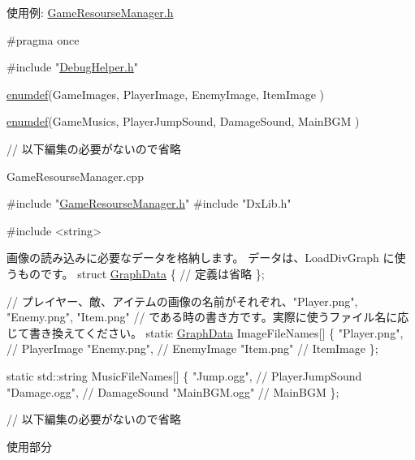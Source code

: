 使用例\+: \hyperlink{_game_resourse_manager_8h}{Game\+Resourse\+Manager.\+h} 
\begin{DoxyCode}
\textcolor{preprocessor}{#pragma once}

\textcolor{preprocessor}{#include "\hyperlink{_debug_helper_8h}{DebugHelper.h}"}

\hyperlink{_game_resourse_manager_8h_ad4ba4fe9f17a7a6b57283d945e6dcde7}{enumdef}(GameImages,
    PlayerImage,
    EnemyImage,
    ItemImage
)

\hyperlink{_game_resourse_manager_8h_ad4ba4fe9f17a7a6b57283d945e6dcde7}{enumdef}(GameMusics,
    PlayerJumpSound,
    DamageSound,
    MainBGM
)

\textcolor{comment}{// 以下編集の必要がないので省略}
\end{DoxyCode}
 Game\+Resourse\+Manager.\+cpp 
\begin{DoxyCode}
\textcolor{preprocessor}{#include "\hyperlink{_game_resourse_manager_8h}{GameResourseManager.h}"}
\textcolor{preprocessor}{#include "DxLib.h"}

\textcolor{preprocessor}{#include <string>}

画像の読み込みに必要なデータを格納します。
データは、LoadDivGraph に使うものです。
\textcolor{keyword}{struct }\hyperlink{struct_graph_data}{GraphData} \{
    \textcolor{comment}{// 定義は省略    }
\};

\textcolor{comment}{// プレイヤー、敵、アイテムの画像の名前がそれぞれ、"Player.png", "Enemy.png", "Item.png"}
\textcolor{comment}{// である時の書き方です。実際に使うファイル名に応じて書き換えてください。}
\textcolor{keyword}{static} \hyperlink{struct_graph_data}{GraphData} ImageFileNames[] \{
    \textcolor{stringliteral}{"Player.png"},   \textcolor{comment}{// PlayerImage}
    \textcolor{stringliteral}{"Enemy.png"},    \textcolor{comment}{// EnemyImage}
    \textcolor{stringliteral}{"Item.png"}      \textcolor{comment}{// ItemImage}
\};

\textcolor{keyword}{static} std::string MusicFileNames[] \{
    \textcolor{stringliteral}{"Jump.ogg"},     \textcolor{comment}{// PlayerJumpSound}
    \textcolor{stringliteral}{"Damage.ogg"},   \textcolor{comment}{// DamageSound}
    \textcolor{stringliteral}{"MainBGM.ogg"}   \textcolor{comment}{// MainBGM}
\};

\textcolor{comment}{// 以下編集の必要がないので省略}
\end{DoxyCode}
 使用部分 
